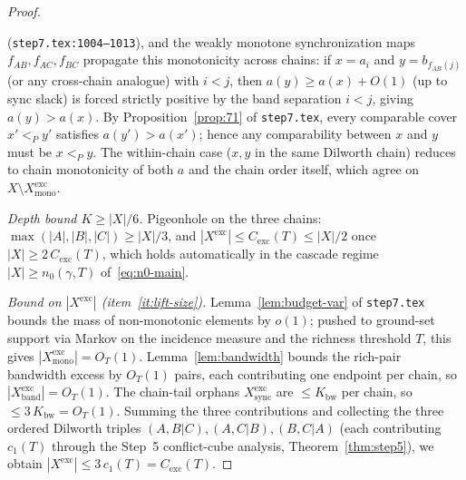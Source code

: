 \begin{proof}
\begin{itemize}[nosep, leftmargin=*]
  (\texttt{step7.tex:1004--1013}), and the weakly monotone
  synchronization maps $f_{AB}, f_{AC}, f_{BC}$ propagate this
  monotonicity across chains: if $x = a_i$ and $y = b_{f_{AB}(j)}$
  (or any cross-chain analogue) with $i < j$, then
  $a(y) \ge a(x) + O(1)$ (up to sync slack) is forced strictly positive
  by the band separation $i < j$, giving $a(y) > a(x)$.  By
  Proposition~\ref{prop:71} of \texttt{step7.tex}, every comparable
  cover $x' <_P y'$ satisfies $a(y') > a(x')$; hence any comparability
  between $x$ and $y$ must be $x <_P y$.  The within-chain case
  ($x, y$ in the same Dilworth chain) reduces to chain monotonicity
  of both $a$ and the chain order itself, which agree on
  $X \setminus X^{\mathrm{exc}}_{\mathrm{mono}}$.
\end{itemize}

\emph{Depth bound $K \ge |X|/6$.}  Pigeonhole on the three chains:
$\max(|A|, |B|, |C|) \ge |X|/3$, and
$|X^{\mathrm{exc}}| \le C_{\mathrm{exc}}(T) \le |X|/2$ once
$|X| \ge 2\,C_{\mathrm{exc}}(T)$, which holds automatically in the
cascade regime $|X| \ge n_0(\gamma, T)$ of~\eqref{eq:n0-main}.

\emph{Bound on $|X^{\mathrm{exc}}|$ (item~\ref{it:lift-size}).}
Lemma~\ref{lem:budget-var} of \texttt{step7.tex} bounds the mass of
non-monotonic elements by $o(1)$; pushed to ground-set support via
Markov on the incidence measure and the richness threshold $T$, this
gives $|X^{\mathrm{exc}}_{\mathrm{mono}}| = O_T(1)$.
Lemma~\ref{lem:bandwidth} bounds the rich-pair bandwidth excess by
$O_T(1)$ pairs, each contributing one endpoint per chain, so
$|X^{\mathrm{exc}}_{\mathrm{band}}| = O_T(1)$.  The chain-tail
orphans $X^{\mathrm{exc}}_{\mathrm{sync}}$ are $\le K_{\mathrm{bw}}$
per chain, so $\le 3\,K_{\mathrm{bw}} = O_T(1)$.  Summing the three
contributions and collecting the three ordered Dilworth triples
$(A,B|C), (A,C|B), (B,C|A)$ (each contributing $c_1(T)$ through the
Step~5 conflict-cube analysis, Theorem~\ref{thm:step5}), we obtain
$|X^{\mathrm{exc}}| \le 3\,c_1(T) = C_{\mathrm{exc}}(T)$.


\end{proof}
